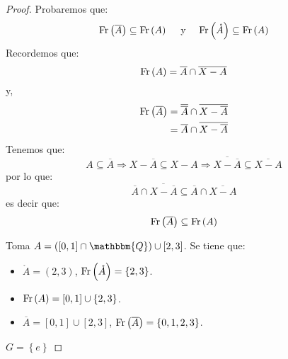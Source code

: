 \documentclass[12pt]{report}
\theoremstyle{largebreak}
\newcommand{\bbm}[1]{\ensuremath{\mathbbm{#1}}}
\begin{document}
    \begin{proof}
        Probaremos que:
        \begin{equation*}
            \textup{Fr}\left(\overline{A}\right)\subseteq\textup{Fr}\left(A\right)\quad\textup{ y }\quad\textup{Fr}\left(\mathring{A}\right)\subseteq\textup{Fr}\left(A\right)
        \end{equation*}
        Recordemos que:
        \begin{equation*}
            \textup{Fr}\left(A\right)=\overline{A}\cap\overline{X-A}
        \end{equation*}
        y,
        \begin{equation*}
            \begin{split}
                \textup{Fr}\left(\overline{A}\right)&=\overline{\overline{A}}\cap\overline{X-\overline{A}}\\
                &=\overline{A}\cap\overline{X-\overline{A}}\\
            \end{split}
        \end{equation*}
        Tenemos que:
        \begin{equation*}
            A\subseteq\overline{A}\Rightarrow X-\overline{A}\subseteq X-A\Rightarrow \overline{X-\overline{A}} \subseteq \overline{X-A}
        \end{equation*}
        por lo que:
        \begin{equation*}
            \overline{A}\cap\overline{X-\overline{A}}\subseteq \overline{A}\cap\overline{X-A}
        \end{equation*}
        es decir que:
        \begin{equation*}
            \textup{Fr}\left(\overline{A}\right)\subseteq \textup{Fr}\left(A\right)
        \end{equation*}

        Toma $A=([0,1]\cap\bbm{Q})\cup[2,3]$. Se tiene que:
        \begin{itemize}
            \item $\mathring{A}=(2,3)$, $\textup{Fr}\left(\mathring{A}\right)=\left\{2,3\right\}$.
            \item $\textup{Fr}\left(A\right)=[0,1]\cup\left\{2,3\right\}$.
            \item $\overline{A}=[0,1]\cup[2,3]$, $\textup{Fr}\left(\overline{A}\right)=\left\{0,1,2,3 \right\}$.
        \end{itemize}

        $G=\left\{e\right\}$


\end{proof}
\end{document}
